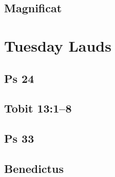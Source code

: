 \subsection{Magnificat}

{%
\parindent 0pt
\noindent
\ifx\preLilyPondExample \undefined
\else
  \expandafter\preLilyPondExample
\fi
\def\lilypondbook{}%

\ifx\postLilyPondExample \undefined
\else
  \expandafter\postLilyPondExample
\fi
}


\section{Tuesday Lauds}

\subsection{Ps 24}

{%
\parindent 0pt
\noindent
\ifx\preLilyPondExample \undefined
\else
  \expandafter\preLilyPondExample
\fi
\def\lilypondbook{}%

\ifx\postLilyPondExample \undefined
\else
  \expandafter\postLilyPondExample
\fi
}

\subsection{Tobit 13:1--8}

{%
\parindent 0pt
\noindent
\ifx\preLilyPondExample \undefined
\else
  \expandafter\preLilyPondExample
\fi
\def\lilypondbook{}%

\ifx\postLilyPondExample \undefined
\else
  \expandafter\postLilyPondExample
\fi
}

\subsection{Ps 33}

{%
\parindent 0pt
\noindent
\ifx\preLilyPondExample \undefined
\else
  \expandafter\preLilyPondExample
\fi
\def\lilypondbook{}%

\ifx\postLilyPondExample \undefined
\else
  \expandafter\postLilyPondExample
\fi
}

\subsection{Benedictus}

{%
\parindent 0pt
\noindent
\ifx\preLilyPondExample \undefined
\else
  \expandafter\preLilyPondExample
\fi
\def\lilypondbook{}%

\ifx\postLilyPondExample \undefined
\else
  \expandafter\postLilyPondExample
\fi
}



